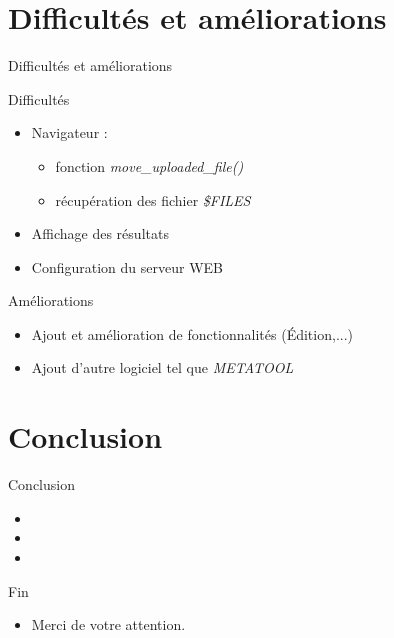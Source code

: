 \documentclass{beamer}
\begin{document}
\section{Difficultés et améliorations}

\begin{frame}{\textcolor{bleu2}{Difficultés et améliorations}}
	\begin{block}{Difficultés}
	\begin{itemize}
	\item Navigateur :\begin{itemize}
	\item fonction \emph{move\_uploaded\_file()}
	\item récupération des fichier \emph{\$FILES}
	\end{itemize}
	\item Affichage des résultats
	\item Configuration du serveur WEB
	\end{itemize}
	\end{block}
	
	\begin{block}{Améliorations}
	\begin{itemize}
	\item Ajout et amélioration de fonctionnalités (Édition,...)
	\item Ajout d'autre logiciel tel que \emph{METATOOL}
	\end{itemize}
	\end{block}
\end{frame}

\section{Conclusion}

\begin{frame}{\textcolor{bleu2}{Conclusion}}
	\begin{itemize}
	\item 
	\item 
	\item 
	\end{itemize}
\end{frame}





\begin{frame}{\textcolor{bleu2}{Fin}}
	\begin{itemize}
 		\item Merci de votre attention.   
 	\end{itemize}
\end{frame}
\end{document}
